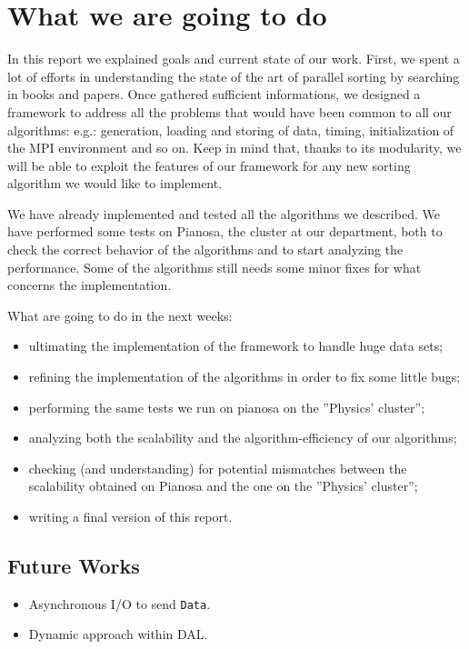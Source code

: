\label{conclusion}
\section{What we are going to do}
In this report we explained goals and current state of our work. First, we spent a lot of efforts in understanding the state of the art of parallel sorting by searching in books and papers. Once gathered sufficient informations, we designed a framework to address all the problems that would have been common to all our algorithms: e.g.: generation, loading and storing of data, timing, initialization of the MPI environment and so on. Keep in mind that, thanks to its modularity, we will be able to exploit the features of our framework for any new sorting algorithm we would like to implement. 

We have already implemented and tested all the algorithms we described. We have performed some tests on Pianosa, the cluster at our department, both to check the correct behavior of the algorithms and to start analyzing the performance. Some of the algorithms still needs some minor fixes for what concerns the implementation.

What are going to do in the next weeks:
\begin{itemize}
\item ultimating the implementation of the framework to handle huge data sets;
\item refining the implementation of the algorithms in order to fix some little bugs;
\item performing the same tests we run on pianosa on the ''Physics' cluster'';
\item analyzing both the scalability and the algorithm-efficiency of our algorithms;
\item checking (and understanding) for potential mismatches between the scalability obtained on Pianosa and the one on the ''Physics' cluster'';
\item writing a final version of this report.
\end{itemize}

\subsection{Future Works}
\begin{itemize}
\item Asynchronous I/O to send \texttt{Data}. 
\item Dynamic approach within DAL.
\end{itemize}